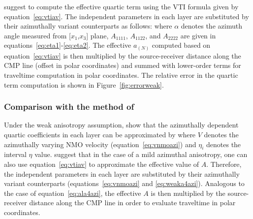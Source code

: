 \cite{alortho} suggest to compute the effective quartic term using the VTI formula given by equation~\ref{eq:vtiav}. The independent parameters in each layer are substituted by their azimuthally variant counterparts as follows:
where $\alpha$ denotes the azimuth angle measured from [$x_1$,$x_3$] plane, $A_{1111}$, $A_{1122}$, and $A_{2222}$ are given in equations~\ref{eq:eta1}-\ref{eq:eta2}. The effective $a_{(N)}$ computed based on equation~\ref{eq:vtiav} is then multiplied by the source-receiver distance along the CMP line (offset in polar coordinates) and summed with lower-order terms for traveltime computation in polar coordinates. The relative error in the quartic term computation is shown in Figure~\ref{fig:errorweak}.

\subsubsection{Comparison with the method of \cite{xu}}

Under the weak anisotropy assumption, \cite{xu} show that the azimuthally dependent quartic coefficients in each layer can be approximated by
where $V$ denotes the  azimuthally varying NMO velocity (equation~\ref{eq:vnmoazi}) and $\eta_i$ denotes the interval $\eta$ value. \cite{vascon} suggest that in the case of a mild azimuthal anisotropy, one can also use equation~\ref{eq:vtiav} to approximate the effective value of $A$. Therefore, the independent parameters in each layer are substituted by their azimuthally variant counterparts (equations~\ref{eq:vnmoazi} and \ref{eq:weaka4azi}). Analogous to the case of equation~\ref{eq:ala4azi}, the effective $A$ is then multiplied by the source-receiver distance along the CMP line in order to evaluate traveltime in polar coordinates. 

